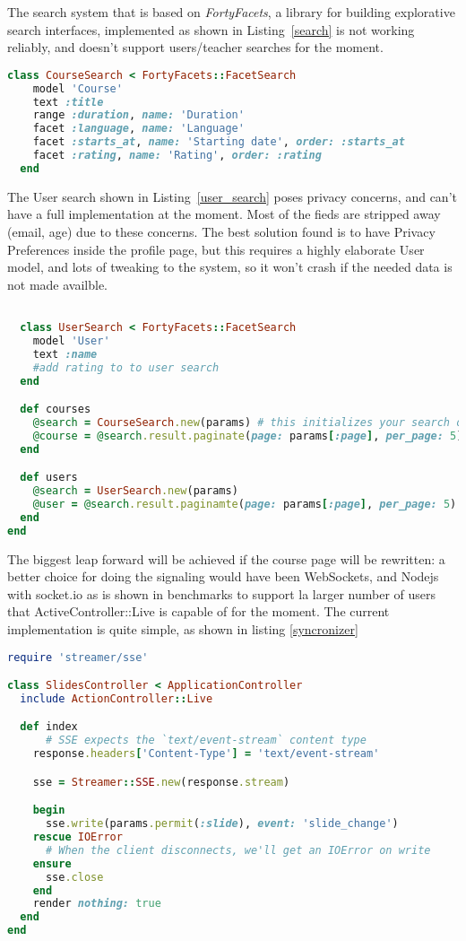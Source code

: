The search system that is based on \textit{FortyFacets}, a library for
building explorative search interfaces, implemented as shown in Listing~\ref{search} is
not working reliably, and doesn't support users/teacher searches for the moment.
\begin{lstlisting}[language=Ruby, caption={Course Search controller}, label=search]
class CourseSearch < FortyFacets::FacetSearch
    model 'Course'
    text :title
    range :duration, name: 'Duration'
    facet :language, name: 'Language'
    facet :starts_at, name: 'Starting date', order: :starts_at
    facet :rating, name: 'Rating', order: :rating
  end
\end{lstlisting}

The User search shown in Listing~\ref{user_search} poses privacy concerns, and can't have a full implementation at the moment.
Most of the fieds are stripped away (email, age) due to these concerns. The best solution found
is to have Privacy Preferences inside the profile page, but this requires a highly elaborate User model,
and lots of tweaking to the system, so it won't crash if the needed data is not made availble.
\begin{lstlisting}[language=Ruby, caption={User search controller}, label=user_search]

  class UserSearch < FortyFacets::FacetSearch
    model 'User'
    text :name
    #add rating to to user search
  end

  def courses
    @search = CourseSearch.new(params) # this initializes your search object from the request params
    @course = @search.result.paginate(page: params[:page], per_page: 5) # optionally paginate through your results
  end

  def users
    @search = UserSearch.new(params)
    @user = @search.result.paginamte(page: params[:page], per_page: 5)
  end
end
\end{lstlisting}

The biggest leap forward will be achieved if the course page will be rewritten:
a better choice for doing the signaling would have been WebSockets, and
Nodejs with socket.io as is shown in benchmarks to support la larger number of users
that ActiveController::Live is capable of for the moment.
The current implementation is quite simple, as shown in listing \ref{syncronizer}

\begin{lstlisting}[language=Ruby, caption={ActionController::Live syncronizer}, label=syncronizer]
require 'streamer/sse'

class SlidesController < ApplicationController
  include ActionController::Live

  def index
      # SSE expects the `text/event-stream` content type
    response.headers['Content-Type'] = 'text/event-stream'

    sse = Streamer::SSE.new(response.stream)

    begin
      sse.write(params.permit(:slide), event: 'slide_change')
    rescue IOError
      # When the client disconnects, we'll get an IOError on write
    ensure
      sse.close
    end
    render nothing: true
  end
end
\end{lstlisting}

